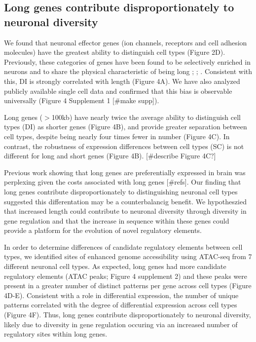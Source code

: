 \subsection{Long genes contribute disproportionately to neuronal diversity}

We found that neuronal effector genes (ion channels, receptors and cell adhesion molecules) have the greatest ability to distinguish cell types (Figure 2D). Previously, these categories of genes have been found to be selectively enriched in neurons and to share the physical characteristic of being long \cite{Sugino_2014}; \cite{Gabel_2015}; \cite{Zylka_2015}. Consistent with this, DI is strongly correlated with length (Figure 4A). We have also analyzed publicly available single cell data and confirmed that this bias is observable universally (Figure 4 Supplement 1 [#make supp]). 

Long genes ($\gt$100kb) have nearly twice the average ability to distinguish cell types (DI) as shorter genes (Figure 4B), and provide greater separation between cell types, despite being nearly four times fewer in number (Figure 4C). In contrast, the robustness of expression differences between cell types (SC) is not different for long and short genes (Figure 4B). [#describe Figure 4C?] 

Previous work showing that long genes are preferentially expressed in brain was perplexing given the costs associated with long genes [#refs]. Our finding that long genes contribute disproportionately to distinguishing neuronal cell types suggested this differentation may be a counterbalancig benefit. We hypotheszied that increased length could contribute to neuronal diversity through diversity in gene regulation and that the increase in sequence within these genes could provide a platform for the evolution of novel regulatory elements.

In order to determine differences of candidate regulatory elements between cell types, we identified sites of enhanced genome accessibility using ATAC-seq \cite{Buenrostro_2013} from 7 different neuronal cell types. As expected, long genes had more candidate regulatory elements (ATAC peaks; Figure 4 supplement 2) and these peaks were present in a greater number of distinct patterns per gene across cell types (Figure 4D-E). Consistent with a role in differential expression, the number of unique patterns correlated with the degree of differential expression across cell types (Figure 4F). Thus, long genes contribute disproportionately to neuronal diversity, likely due to diversity in gene regulation occuring via an increased number of regulatory sites within long genes. 


